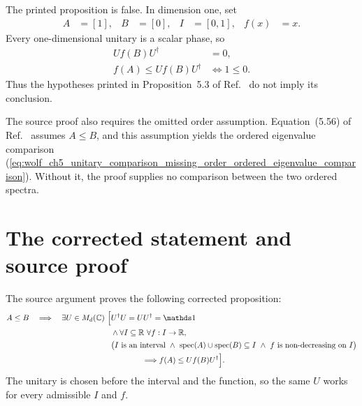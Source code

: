 \documentclass{article}
\begin{document}
The printed proposition is false. In dimension one, set
\begin{align}
    A&=[1],
    &
    B&=[0],
    &
    I&=[0,1],
    &
    f(x)&=x.
    \label{eq:wolf_ch5_unitary_comparison_missing_order_scalar_counterexample}
\end{align}
Every one-dimensional unitary is a scalar phase, so
\begin{align}
    U f(B)U^\dagger
        &=0,
    \label{eq:wolf_ch5_unitary_comparison_missing_order_scalar_conjugation}\\
    f(A)\leq U f(B)U^\dagger
        &\Longleftrightarrow 1\leq0.
    \label{eq:wolf_ch5_unitary_comparison_missing_order_scalar_contradiction}
\end{align}
Thus the hypotheses printed in Proposition~5.3 of
Ref.~\cite{Wolf2012Quantum} do not imply its conclusion.

The source proof also requires the omitted order assumption. Equation~(5.56)
of Ref.~\cite{Wolf2012Quantum} assumes $A\leq B$, and this assumption yields
the ordered eigenvalue comparison
(\ref{eq:wolf_ch5_unitary_comparison_missing_order_ordered_eigenvalue_comparison}).
Without it, the proof supplies no comparison between the two ordered spectra.

\section{The corrected statement and source proof}

The source argument proves the following corrected proposition:
\begin{align}
    A\leq B
        \quad\Longrightarrow\quad
        \exists U\in\MN{d}\ \Bigl[
        &U^\dagger U=UU^\dagger=\Id
    \label{eq:wolf_ch5_unitary_comparison_missing_order_corrected_unitary_quantifier}\\
        &{}\land
        \forall I\subseteq\mathbb R\
        \forall f:I\to\mathbb R,
        \nonumber\\
        &\bigl(        I\text{ is an interval}
            \ \land\
            \operatorname{spec}(A)\cup\operatorname{spec}(B)\subseteq I
            \ \land\
            f\text{ is non-decreasing on }I
        \bigr)
        \nonumber\\
        &\hspace{4em}\Longrightarrow
            f(A)\leq U f(B)U^\dagger
        \Bigr].
    \label{eq:wolf_ch5_unitary_comparison_missing_order_corrected_statement}
\end{align}
The unitary is chosen before the interval and the function, so the same $U$
works for every admissible $I$ and $f$.
\end{document}
